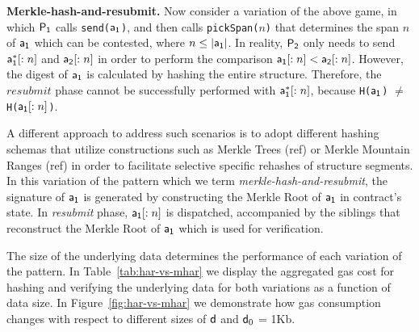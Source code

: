 \noindent \textbf{Merkle-hash-and-resubmit.} Now consider a variation of the
above game, in which $\mathsf{P_1}$ calls \texttt{send(}$\mathsf{a_1}$\texttt{)}, and then
calls \texttt{pickSpan(}$n$\texttt{)} that determines the span $n$ of $\mathsf{a_1}$
which can be contested, where $n \leq |\mathsf{a_1}|$. In reality, $\mathsf{P_2}$ only needs
to send $\mathsf{a_1^*}[:n]$ and $\mathsf{a_2}[:n]$ in order to perform the comparison
$\mathsf{a_1}[:n] < \mathsf{a_2}[:n]$. However, the digest of $\mathsf{a_1}$ is calculated by
hashing the entire structure. Therefore, the $resubmit$ phase cannot be
successfully performed with $\mathsf{a_1^*}[:n]$, because \texttt{H(}$\mathsf{a_1}$\texttt{)}
$\ne$ \texttt{H(}$\mathsf{a_1}[:n]$\texttt{)}.

A different approach to address such scenarios is to adopt different hashing
schemas that utilize constructions such as Merkle Trees (ref) or Merkle
Mountain Ranges (ref) in order to facilitate selective specific rehashes of
structure segments. In this variation of the pattern which we term
\emph{merkle-hash-and-resubmit}, the signature of $\mathsf{a_1}$ is generated by
constructing the Merkle Root of $\mathsf{a_1}$ in contract's state. In \emph{resubmit}
phase, $\mathsf{a_1}[:n]$ is dispatched, accompanied by the siblings that reconstruct
the Merkle Root of $\mathsf{a_1}$ which is used for verification.

The size of the underlying data determines the performance of each variation of
the pattern. In Table~\ref{tab:har-vs-mhar} we display the aggregated gas cost
for hashing and verifying the underlying data for both variations as a function
of data size. In Figure~\ref{fig:har-vs-mhar} we demonstrate how gas
consumption changes with respect to different sizes of $\mathsf{d}$ and $\mathsf{d}_0$ =
1Kb.




